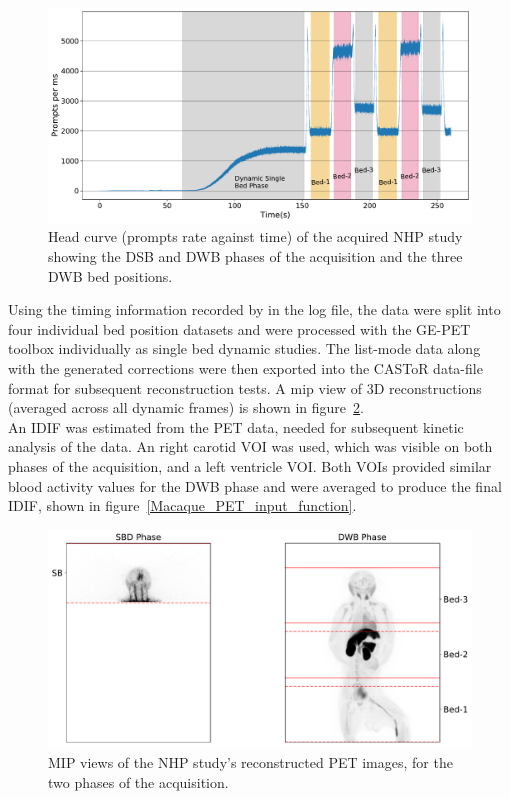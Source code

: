 \begin{figure} [ht!]
\centering
\includegraphics[scale=0.45,angle=0]{3_Results/3_1_DWB_Optimization/figures/3_1_Macaque_Head_curve_Phases.pdf}
\caption{Head curve (prompts rate against time) of the acquired NHP study showing the DSB and DWB phases of the acquisition and the three DWB bed positions.}
\label{fig3_1:Macaque_Head_Curve_Phases}
\end{figure}
%
Using the timing information recorded by in the log file, the data were split into four individual bed position datasets and were processed with the GE-PET toolbox individually as single bed dynamic studies. The list-mode data along with the generated corrections were then exported into the CASToR data-file format for subsequent reconstruction tests. A \gls{mip} view of 3D reconstructions (averaged across all dynamic frames) is shown in figure~\ref{fig3_1:Macaque_PET}. \\
An IDIF was estimated from the PET data, needed for subsequent kinetic analysis of the data. An right carotid VOI was used, which was visible on both phases of the acquisition, and a left ventricle VOI. Both VOIs provided similar blood activity values for the DWB phase and were averaged to produce the final IDIF, shown in figure~\ref{Macaque_PET_input_function}.
%
\begin{figure} [ht!]
\centering
\includegraphics[scale=0.45,angle=0]{3_Results/3_1_DWB_Optimization/figures/3_1_Macaque_PET.pdf}
\caption{MIP views of the NHP study's reconstructed PET images, for the two phases of the acquisition.}
\label{fig3_1:Macaque_PET}
\end{figure}
